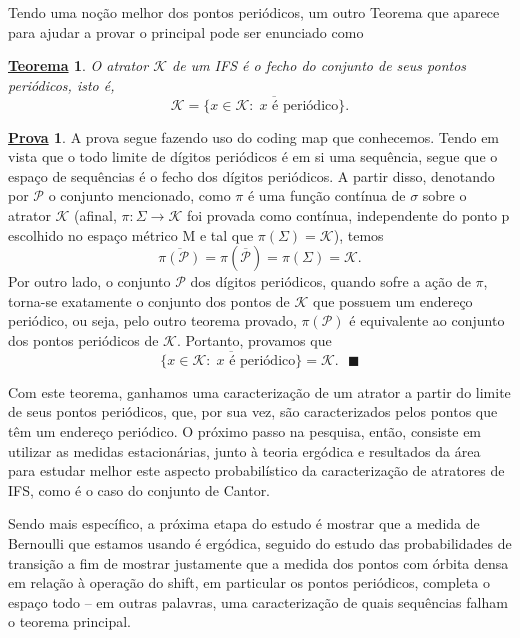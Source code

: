 \documentclass[12pt]{article}
\newtheorem*{theorem*}{\underline{Teorema}}
\theoremstyle{definition}
\newtheorem*{proof*}{\underline{Prova}}
\renewcommand\qedsymbol{$\blacksquare$}
\begin{document}
Tendo uma noção melhor dos pontos periódicos, um outro Teorema que aparece para ajudar a provar o principal pode ser enunciado como
\begin{theorem*}
	O atrator \(\mathcal{K}\) de um IFS é o fecho do conjunto de seus pontos periódicos, isto é,
	\[
		\mathcal{K} = \overline{\{x\in \mathcal{K}:\; x\text{ é periódico}\}}.
	\]
\end{theorem*}
\begin{proof*}
	A prova segue fazendo uso do coding map que conhecemos. Tendo em vista que o todo limite de dígitos periódicos é em si uma sequência, segue que o espaço de sequências é o fecho dos dígitos periódicos.
	A partir disso, denotando por \(\mathcal{P}\) o conjunto mencionado, como \(\pi \) é uma função contínua de \(\sigma \) sobre o atrator \(\mathcal{K}\) (afinal, \(\pi :\Sigma \rightarrow \mathcal{K}\) foi provada como contínua, independente do ponto p escolhido no espaço métrico M e tal que \(\pi (\Sigma ) = \mathcal{K}\)), temos
	\[
		\overline{\pi (\mathcal{P})} = \pi (\overline{\mathcal{P}}) = \pi (\Sigma ) = \mathcal{K}.
	\]
	Por outro lado, o conjunto \(\mathcal{P}\) dos dígitos periódicos, quando sofre a ação de \(\pi \), torna-se exatamente o conjunto dos pontos de \(\mathcal{K}\) que possuem um endereço periódico, ou seja, pelo outro teorema provado, \(\pi (\mathcal{P})\) é equivalente ao conjunto dos pontos periódicos de \(\mathcal{K}\). Portanto, provamos que
	\[
		\overline{\{x\in \mathcal{K}:\; x\text{ é periódico}\}} = \mathcal{K}. \text{ \qedsymbol}
	\]
\end{proof*}

Com este teorema, ganhamos uma caracterização de um atrator a partir do limite de seus pontos periódicos, que, por sua vez, são caracterizados pelos pontos que têm um endereço periódico. O próximo passo na pesquisa, então, consiste em utilizar as medidas estacionárias, junto à teoria ergódica e resultados da área para estudar melhor este aspecto probabilístico da caracterização de atratores de IFS, como é o caso do conjunto de Cantor.

Sendo mais específico, a próxima etapa do estudo é mostrar que a medida de Bernoulli que estamos usando é ergódica, seguido do estudo das probabilidades de transição a fim de mostrar justamente que a medida dos pontos com órbita densa em relação à operação do shift, em particular os pontos periódicos, completa o espaço todo -- em outras palavras, uma caracterização de quais sequências falham o teorema principal.
\end{document}
